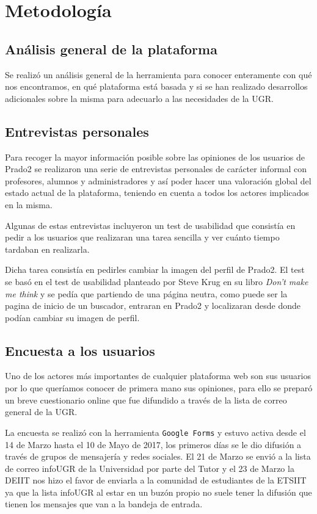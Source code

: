 \chapter{Metodología}

\section{Análisis general de la plataforma}
Se realizó un análisis general de la herramienta para conocer enteramente con qué nos encontramos, en qué plataforma está basada y si se han realizado desarrollos adicionales sobre la misma para adecuarlo a las necesidades de la UGR.

\section{Entrevistas personales}

Para recoger la mayor información posible sobre las opiniones de los usuarios de Prado2 se realizaron una serie de entrevistas personales de carácter informal con profesores, alumnos y administradores y así poder hacer una valoración global del estado actual de la plataforma, teniendo en cuenta a todos los actores implicados en la misma.

\bigskip
Algunas de estas entrevistas incluyeron un test de usabilidad que consistía en pedir a los usuarios que realizaran una tarea sencilla y ver cuánto tiempo tardaban en realizarla. 

\bigskip
Dicha tarea consistía en pedirles cambiar la imagen del perfil de Prado2. El test se basó en el test de usabilidad planteado por Steve Krug en su libro \textit{Don't make me think} \cite{stevekrug} y se pedía que partiendo de una página neutra, como puede ser la pagina de inicio de un buscador, entraran en Prado2 y localizaran desde donde podían cambiar su imagen de perfil.


\section{Encuesta a los usuarios}
Uno de los actores más importantes de cualquier plataforma web son sus usuarios por lo que queríamos conocer de primera mano sus opiniones, para ello se preparó un breve cuestionario online que fue difundido a través de la lista de correo general de la UGR.

\bigskip
La encuesta se realizó con la herramienta \texttt{Google Forms} y estuvo activa desde el 14 de Marzo hasta el 10 de Mayo de 2017, los primeros días se le dio difusión a través de grupos de mensajería y redes sociales. El 21 de Marzo se envió a la lista de correo infoUGR de la Universidad por parte del Tutor y el 23 de Marzo la DEIIT nos hizo el favor de enviarla a la comunidad de estudiantes de la ETSIIT ya que la lista infoUGR al estar en un buzón propio no suele tener la difusión que tienen los mensajes que van a la bandeja de entrada.

